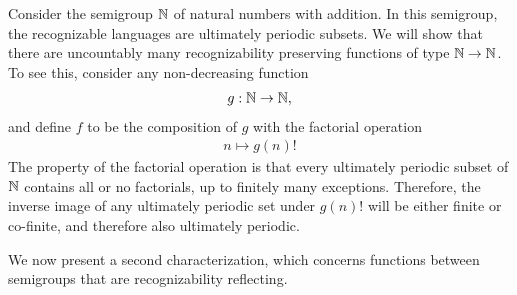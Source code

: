 \begin{myexample}
    Consider the semigroup ${\mathbb N}$ of natural numbers with addition. In this semigroup, the recognizable languages are ultimately periodic subsets.  We will show that there are uncountably many recognizability preserving functions of type ${\mathbb N} \to {\mathbb N}$.
    To see this, consider any  non-decreasing function 
    \begin{align*}
    g : {\mathbb N} \to {\mathbb N},
    \end{align*}
    and define $f$ to be the composition of $g$ with the factorial operation
    \begin{align*}
    n \mapsto g(n)!
    \end{align*}
    The property of the factorial operation is that every ultimately periodic subset of ${\mathbb N}$ contains all or no factorials, up to finitely many exceptions. Therefore, the inverse image of any ultimately periodic set under $g(n)!$ will be either finite or co-finite, and therefore also ultimately periodic.
\end{myexample}


We now present a second characterization, which concerns functions between semigroups that are recognizability reflecting.

